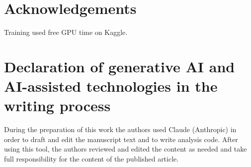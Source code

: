 \documentclass[preprint,12pt]{elsarticle}
\begin{document}
\section*{Acknowledgements}
Training used free GPU time on Kaggle.

\section*{Declaration of generative AI and AI-assisted technologies in the writing process}
During the preparation of this work the authors used Claude (Anthropic) in order to draft and edit the manuscript text
and to write analysis code. After using this tool, the authors reviewed and edited the content as needed and take full
responsibility for the content of the published article.


\end{document}
